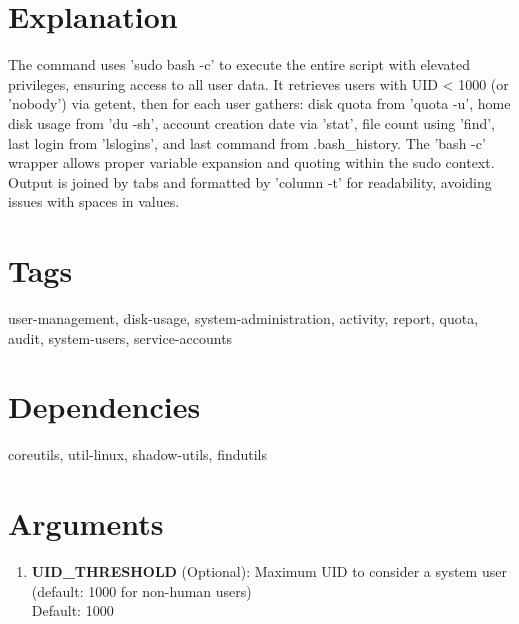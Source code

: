 \documentclass[openany]{book}
\begin{document}
\section*{Explanation}
The command uses 'sudo bash -c' to execute the entire script with elevated privileges, ensuring access to all user data. It retrieves users with UID < 1000 (or 'nobody') via getent, then for each user gathers: disk quota from 'quota -u', home disk usage from 'du -sh', account creation date via 'stat', file count using 'find', last login from 'lslogins', and last command from .bash\_history. The 'bash -c' wrapper allows proper variable expansion and quoting within the sudo context. Output is joined by tabs and formatted by 'column -t' for readability, avoiding issues with spaces in values.

\section*{Tags}
user-management, disk-usage, system-administration, activity, report, quota, audit, system-users, service-accounts

\section*{Dependencies}
coreutils, util-linux, shadow-utils, findutils


\section*{Arguments}
\begin{enumerate}
  \item \textbf{UID\_THRESHOLD} (Optional): Maximum UID to consider a system user (default: 1000 for non-human users) \\ Default: 1000
\end{enumerate}
\end{document}
